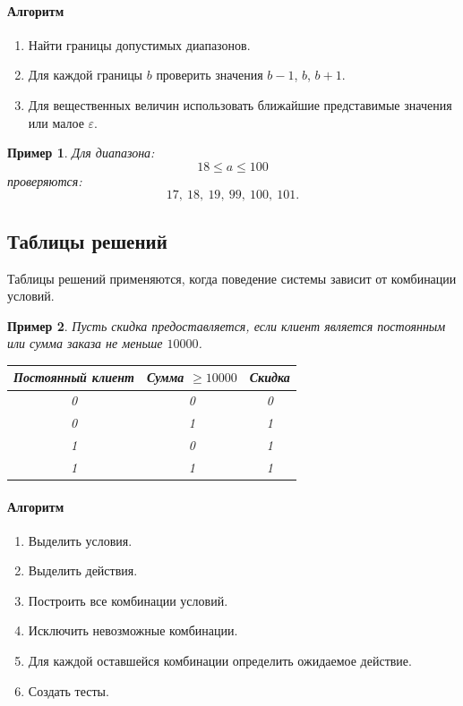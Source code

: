 \documentclass[12pt,a4paper]{article}
\newtheorem{example}{Пример}
\begin{document}
\paragraph{Алгоритм}

\begin{enumerate}
    \item Найти границы допустимых диапазонов.
    \item Для каждой границы $b$ проверить значения $b-1$, $b$, $b+1$.
    \item Для вещественных величин использовать ближайшие представимые значения или малое $\varepsilon$.
\end{enumerate}

\begin{example}
Для диапазона:
\[
18 \leq a \leq 100
\]
проверяются:
\[
17,\ 18,\ 19,\ 99,\ 100,\ 101.
\]
\end{example}

\subsection{Таблицы решений}

Таблицы решений применяются, когда поведение системы зависит от комбинации условий.

\begin{example}
Пусть скидка предоставляется, если клиент является постоянным или сумма заказа не меньше $10000$.

\begin{center}
\begin{tabular}{c c c}
\toprule
Постоянный клиент & Сумма $\geq 10000$ & Скидка \\
\midrule
0 & 0 & 0 \\
0 & 1 & 1 \\
1 & 0 & 1 \\
1 & 1 & 1 \\
\bottomrule
\end{tabular}
\end{center}
\end{example}

\paragraph{Алгоритм}

\begin{enumerate}
    \item Выделить условия.
    \item Выделить действия.
    \item Построить все комбинации условий.
    \item Исключить невозможные комбинации.
    \item Для каждой оставшейся комбинации определить ожидаемое действие.
    \item Создать тесты.
\end{enumerate}
\end{document}
